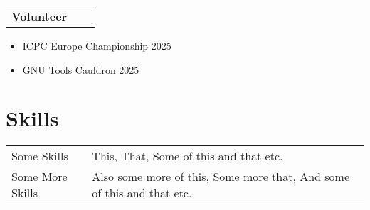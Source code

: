 \documentclass[a4paper,12pt]{article}
\makeatletter
\newenvironment{joblong}[2]
    {
    \begin{tabularx}{\linewidth}{@{}l X r@{}}
    \textbf{#1} & \hfill &  #2 \\[3.75pt]
    \end{tabularx}
    \begin{minipage}[t]{\linewidth}
    \begin{itemize}[nosep,after=\strut, leftmargin=1em, itemsep=3pt,label=--]
    }
    {
    \end{itemize}
    \end{minipage}    
    }
\makeatother
\begin{document}
\begin{joblong}{Volunteer}{}
    \item ICPC Europe Championship 2025
    \item GNU Tools Cauldron 2025
\end{joblong}


\section{Skills}
\begin{tabularx}{\linewidth}{@{}l X@{}}
Some Skills &  \normalsize{This, That, Some of this and that etc.}\\
Some More Skills  &  \normalsize{Also some more of this, Some more that, And some of this and that etc.}\\  
\end{tabularx}

\end{document}
